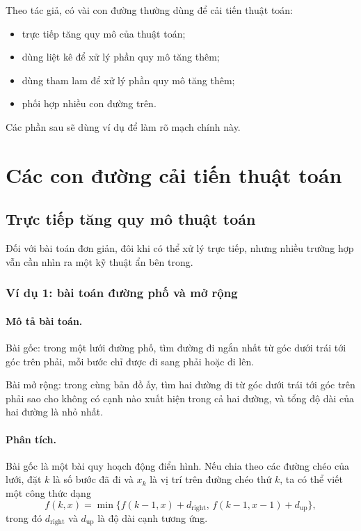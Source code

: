 \documentclass[11pt]{article}
\begin{document}
Theo tác giả, có vài con đường thường dùng để cải tiến thuật toán:
\begin{itemize}
  \item trực tiếp tăng quy mô của thuật toán;
  \item dùng liệt kê để xử lý phần quy mô tăng thêm;
  \item dùng tham lam để xử lý phần quy mô tăng thêm;
  \item phối hợp nhiều con đường trên.
\end{itemize}
Các phần sau sẽ dùng ví dụ để làm rõ mạch chính này.

\section{Các con đường cải tiến thuật toán}

\subsection{Trực tiếp tăng quy mô thuật toán}

Đối với bài toán đơn giản, đôi khi có thể xử lý trực tiếp, nhưng nhiều trường
hợp vẫn cần nhìn ra một kỹ thuật ẩn bên trong.

\subsubsection{Ví dụ 1: bài toán đường phố và mở rộng}

\paragraph{Mô tả bài toán.}
Bài gốc: trong một lưới đường phố, tìm đường đi ngắn nhất từ góc dưới trái tới
góc trên phải, mỗi bước chỉ được đi sang phải hoặc đi lên.

Bài mở rộng: trong cùng bản đồ ấy, tìm hai đường đi từ góc dưới trái tới góc
trên phải sao cho không có cạnh nào xuất hiện trong cả hai đường, và tổng độ
dài của hai đường là nhỏ nhất.

\paragraph{Phân tích.}
Bài gốc là một bài quy hoạch động điển hình. Nếu chia theo các đường chéo của
lưới, đặt $k$ là số bước đã đi và $x_k$ là vị trí trên đường chéo thứ $k$, ta
có thể viết một công thức dạng
\[
  f(k,x)=\min\{f(k-1,x)+d_{\text{right}},\,
              f(k-1,x-1)+d_{\text{up}}\},
\]
trong đó $d_{\text{right}}$ và $d_{\text{up}}$ là độ dài cạnh tương ứng.
\end{document}
